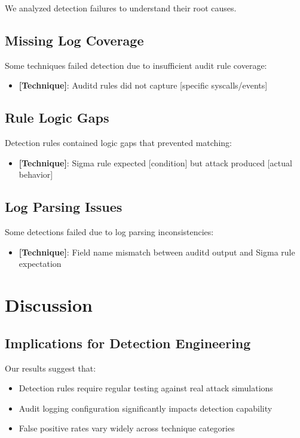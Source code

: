 \documentclass[11pt,a4paper]{article}
\begin{document}
We analyzed detection failures to understand their root causes.

\subsection{Missing Log Coverage}

Some techniques failed detection due to insufficient audit rule coverage:

\begin{itemize}
    \item \textbf{[Technique]}: Auditd rules did not capture [specific syscalls/events]
\end{itemize}

\subsection{Rule Logic Gaps}

Detection rules contained logic gaps that prevented matching:

\begin{itemize}
    \item \textbf{[Technique]}: Sigma rule expected [condition] but attack produced [actual behavior]
\end{itemize}

\subsection{Log Parsing Issues}

Some detections failed due to log parsing inconsistencies:

\begin{itemize}
    \item \textbf{[Technique]}: Field name mismatch between auditd output and Sigma rule expectation
\end{itemize}

\section{Discussion}

\subsection{Implications for Detection Engineering}

Our results suggest that:
\begin{itemize}
    \item Detection rules require regular testing against real attack simulations
    \item Audit logging configuration significantly impacts detection capability
    \item False positive rates vary widely across technique categories
\end{itemize}
\end{document}
